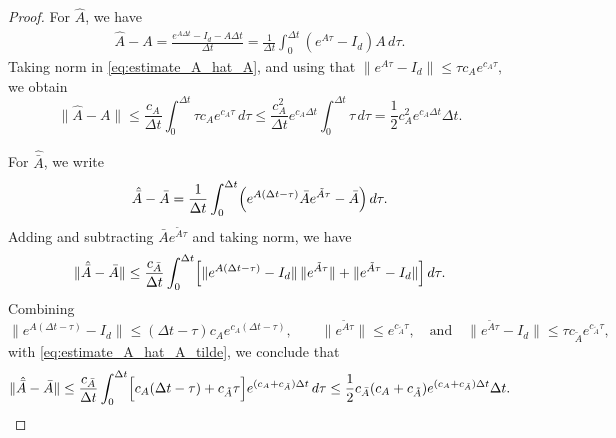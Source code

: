 \documentclass[10pt,a4paper]{amsart}
\begin{document}
\begin{proof}
For $\hat A$, we have
\begin{align}\label{eq:estimate_A_hat_A}
     \hat A-A
    =
    \frac{e^{A\Delta t}-I_d-A\Delta t}{\Delta t}
    =
    \frac1{\Delta t}\int_0^{\Delta t}(e^{A\tau}-I_d)A\,d\tau.
\end{align}
Taking norm in \eqref{eq:estimate_A_hat_A}, and using that $\|e^{A\tau}-I_d\|
\le
\tau c_A e^{c_A\tau},$ we obtain
\[
    \|\hat A-A\|
    \le
    \frac{c_A}{\Delta t}\int_0^{\Delta t}\tau c_A e^{c_A\tau}\,d\tau
    \le
    \frac{c_A^2}{\Delta t}e^{c_A\Delta t}\int_0^{\Delta t}\tau\,d\tau
    =
    \frac12 c_A^2 e^{c_A\Delta t}\Delta t.
\]

For $\hat{\bar A}$, we write
\[
    \hat{\bar A}-\bar A
    =
    \frac1{\Delta t}\int_0^{\Delta t}
    \Bigl(
        e^{A(\Delta t-\tau)}\bar A e^{\tilde A\tau}-\bar A
    \Bigr)\,d\tau.
\]
Adding and subtracting $\bar A e^{\tilde A\tau}$ and taking norm, we have
\begin{align}\label{eq:estimate_A_hat_A_tilde}
        \|\hat{\bar A}-\bar A\|
    \le
    \frac{c_{\bar A}}{\Delta t}\int_0^{\Delta t}
    \Bigl[
        \|e^{A(\Delta t-\tau)}-I_d\|\,\|e^{\tilde A\tau}\|
        +
        \|e^{\tilde A\tau}-I_d\|
    \Bigr]\,d\tau.
\end{align}
Combining
\[
\|e^{A(\Delta t-\tau)}-I_d\|
\le
(\Delta t-\tau)c_A e^{c_A(\Delta t-\tau)},
\qquad
\|e^{\tilde A\tau}\|\le e^{c_{\tilde A}\tau},\quad
\text{and}\quad\|e^{\tilde A\tau}-I_d\|
\le
\tau c_{\tilde A}e^{c_{\tilde A}\tau},
\]
with \eqref{eq:estimate_A_hat_A_tilde}, we conclude that
\[
    \|\hat{\bar A}-\bar A\|
    \le
    \frac{c_{\bar A}}{\Delta t}
    \int_0^{\Delta t}
    \Bigl[
        c_A(\Delta t-\tau)
        +
        c_{\tilde A}\tau
    \Bigr]
    e^{(c_A+c_{\tilde A})\Delta t}\,d\tau\le
    \frac12 c_{\bar A}(c_A+c_{\tilde A})
    e^{(c_A+c_{\tilde A})\Delta t}\Delta t.
\]


\end{proof}
\end{document}
